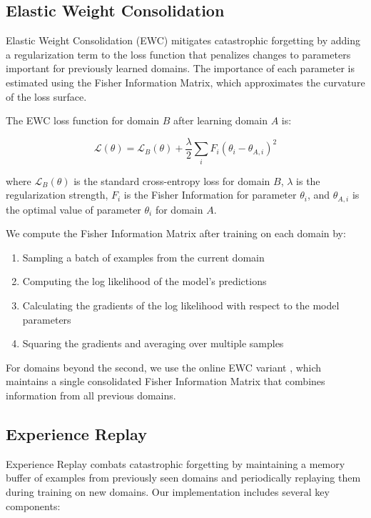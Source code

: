 \documentclass[conference]{IEEEtran}
\begin{document}
\subsection{Elastic Weight Consolidation}
Elastic Weight Consolidation (EWC) \cite{b1} mitigates catastrophic forgetting by adding a regularization term to the loss function that penalizes changes to parameters important for previously learned domains. The importance of each parameter is estimated using the Fisher Information Matrix, which approximates the curvature of the loss surface.

The EWC loss function for domain $B$ after learning domain $A$ is:

\begin{equation}
\mathcal{L}(\theta) = \mathcal{L}_B(\theta) + \frac{\lambda}{2} \sum_i F_i (\theta_i - \theta_{A,i})^2
\end{equation}

where $\mathcal{L}_B(\theta)$ is the standard cross-entropy loss for domain $B$, $\lambda$ is the regularization strength, $F_i$ is the Fisher Information for parameter $\theta_i$, and $\theta_{A,i}$ is the optimal value of parameter $\theta_i$ for domain $A$.

We compute the Fisher Information Matrix after training on each domain by:
\begin{enumerate}
    \item Sampling a batch of examples from the current domain
    \item Computing the log likelihood of the model's predictions
    \item Calculating the gradients of the log likelihood with respect to the model parameters
    \item Squaring the gradients and averaging over multiple samples
\end{enumerate}

For domains beyond the second, we use the online EWC variant \cite{b2}, which maintains a single consolidated Fisher Information Matrix that combines information from all previous domains.

\subsection{Experience Replay}
Experience Replay \cite{b6} combats catastrophic forgetting by maintaining a memory buffer of examples from previously seen domains and periodically replaying them during training on new domains. Our implementation includes several key components:
\end{document}
